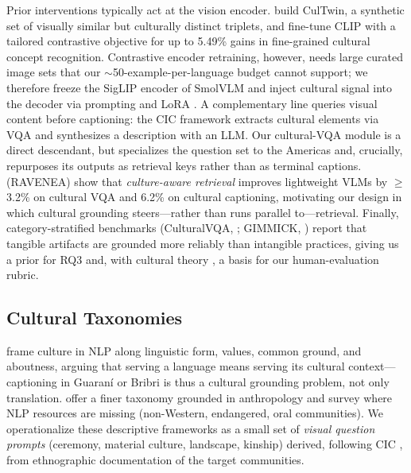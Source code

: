 \documentclass[11pt]{article}
\begin{document}
Prior interventions typically act at the vision encoder.
\citet{huang2025cultureclip} build CulTwin, a synthetic set of visually similar
but culturally distinct triplets, and fine-tune CLIP with a tailored contrastive
objective for up to 5.49\% gains in fine-grained cultural concept recognition.
Contrastive encoder retraining, however, needs large curated image sets that our
$\sim$50-example-per-language budget cannot support; we therefore freeze the
SigLIP encoder \citep{zhai2023siglip} of SmolVLM
\citep{marafioti2025smolvlm} and inject cultural signal into the decoder via
prompting and LoRA \citep{hu2022lora}. A complementary line queries visual
content before captioning: the CIC framework \citep{yun2024cic} extracts
cultural elements via VQA and synthesizes a description with an LLM. Our
cultural-VQA module is a direct descendant, but specializes the question set to
the Americas and, crucially, repurposes its outputs as retrieval keys rather
than as terminal captions. \citet{li2026ravenea} (RAVENEA) show that
\emph{culture-aware retrieval} improves lightweight VLMs by $\geq$3.2\% on
cultural VQA and 6.2\% on cultural captioning, motivating our design in which
cultural grounding steers—rather than runs parallel to—retrieval. Finally,
category-stratified benchmarks (CulturalVQA, \citealp{nayak2024culturalvqa};
GIMMICK, \citealp{schneider2025gimmick}) report that tangible artifacts are
grounded more reliably than intangible practices, giving us a prior for RQ3 and,
with cultural theory \citep{yadav2025cultural}, a basis for our human-evaluation
rubric.

\subsection{Cultural Taxonomies}
\citet{hershcovich2022culture} frame culture in NLP along linguistic form,
values, common ground, and aboutness, arguing that serving a language means
serving its cultural context—captioning in Guaraní or Bribri is thus a cultural
grounding problem, not only translation. \citet{liu2025culturaltaxonomy} offer a
finer taxonomy grounded in anthropology and survey where NLP resources are
missing (non-Western, endangered, oral communities). We operationalize these
descriptive frameworks as a small set of \emph{visual question prompts}
(ceremony, material culture, landscape, kinship) derived, following CIC
\citep{yun2024cic}, from ethnographic documentation of the target communities.
\end{document}
